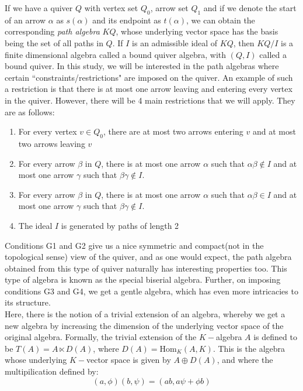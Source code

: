 \documentclass{report}
\theoremstyle{definition}
\numberwithin{figure}{section}
\begin{document}
If we have a quiver $Q$ with vertex set $Q_0$, arrow set $Q_1$ and if we denote the start of an arrow $\alpha$ as $s(\alpha)$ and its endpoint as $t(\alpha)$, we can obtain the corresponding \textit{path algebra} $KQ$, whose underlying vector space has the basis being the set of all paths in $Q$. If $I$ is an admissible ideal of $KQ$, then $KQ/I$ is a finite dimensional algebra called a bound quiver algebra, with $(Q,I)$ called a bound quiver\cite{schiffler2014quiver,assem2006elements}. In this study, we will be interested in the path algebras where certain ``constraints/restrictions" are imposed on the quiver. An example of such a restriction is that there is at most one arrow leaving and entering every vertex in the quiver. However, there will be 4 main restrictions that we will apply. They are as follows: 

\begin{enumerate}
    \item[G1)] For every vertex $v\in Q_0$, there are at most two arrows entering $v$ and at most two arrows leaving $v$
    \item[G2)] For every arrow $\beta$ in $Q$, there is at most one arrow $\alpha$ such that $\alpha\beta \notin I$ and at most one arrow $\gamma$ such that $\beta\gamma\notin I$.
    \item[G3)] For every arrow $\beta$ in $Q$, there is at most one arrow $\alpha$ such that $\alpha\beta \in I$ and at most one arrow $\gamma$ such that $\beta\gamma \notin I$.
    \item[G4)] The ideal $I$ is generated by paths of length 2 
\end{enumerate}

Conditions G1 and G2 give us a nice symmetric and compact(not in the topological sense) view of the quiver, and as one would expect, the path algebra obtained from this type of quiver naturally has interesting properties too. This type of algebra is known as the special biserial algebra. Further, on imposing conditions G3 and G4, we get a gentle algebra, which has even more intricacies to its structure. \\

Here, there is the notion of a trivial extension of an algebra, whereby we get a new algebra  by increasing the dimension of the underlying vector space of the original algebra. Formally, the trivial extension of the $K-$algebra $A$ is defined to be $T(A)=A\ltimes D(A)$, where $D(A)=\mathrm{Hom}_K(A,K)$. This is the algebra whose underlying $K-$vector space is given by $A \oplus D(A)$, and where the multipilication defined by:
\[
(a,\phi)(b,\psi)=(ab,a\psi+\phi b)
\]
\end{document}

